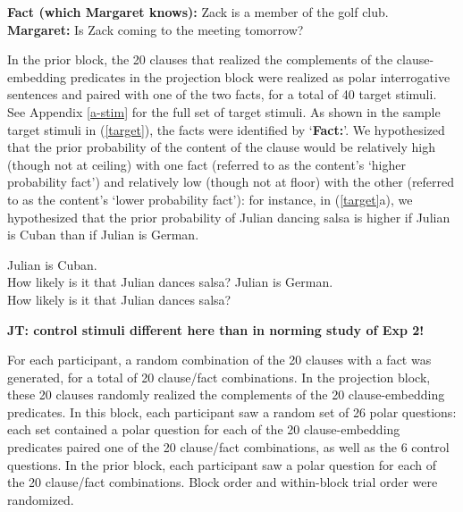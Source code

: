 \documentclass[11pt,fleqn]{article}
\newcommand{\6}{\mbox{$[\hspace*{-.6mm}[$}}
\newcommand{\9}{\mbox{$]\hspace*{-.6mm}]$}}
\newcommand{\jt}[1]{\textbf{\color{blue}JT: #1}}
\begin{document}
\begin{exe}
\ex\label{control} {\bf Fact (which Margaret knows):}  Zack is a member of the golf club. \\ {\bf Margaret:} Is Zack coming to the meeting tomorrow?
\end{exe}

In the prior block, the 20 clauses that realized the complements of the clause-embedding predicates in the projection block were realized as polar interrogative sentences and paired with one of the two facts, for a total of 40 target stimuli. See Appendix \ref{a-stim} for the full set of target stimuli. As shown in the sample target stimuli in (\ref{target}), the facts were identified by `{\bf Fact:}'. We hypothesized that the prior probability of the content of the clause would be relatively high (though not at ceiling) with one fact (referred to as the content's `higher probability fact') and relatively low (though not at floor) with the other (referred to as the content's `lower probability fact'): for instance, in (\ref{target}a), we hypothesized that the prior probability of Julian dancing salsa is higher if Julian is Cuban than if Julian is German.

\begin{exe}
\ex\label{target} 
\begin{xlist}
 Julian is Cuban. \\ How likely is it that Julian dances salsa?
 Julian is German. \\ How likely is it that Julian dances salsa?
\end{xlist}
\end{exe}

\jt{\bf control stimuli different here than in norming study of Exp 2!}

For each participant, a random combination of the 20 clauses with a fact was generated, for a total of 20 clause/fact combinations. In the projection block, these 20 clauses randomly realized the complements of the 20 clause-embedding predicates. In this block, each participant saw a random set of 26 polar questions: each set contained a polar question for each of the 20 clause-embedding predicates paired one of the 20 clause/fact combinations, as well as the 6 control questions. In the prior block, each participant saw a polar question for each of the 20 clause/fact combinations. Block order and within-block trial order were randomized.
\end{document}
